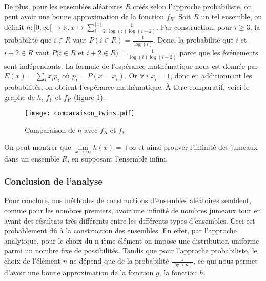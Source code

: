 \documentclass[../main.tex]{subfiles}
\begin{document}
	De plus, pour les ensembles aléatoires $R$ créés selon l'approche probabiliste, on peut avoir une bonne approximation de la fonction $f_{R}$. Soit $R$ un tel ensemble, on définit $ h : [0, \infty[ \rightarrow \mathbb{R}, x \mapsto \sum_{i = 2}^{\lfloor x \rfloor}  \frac{1}{\log(i) \log(i+2)}$. Par construction, pour $i \geqslant 3$, la probabilité que $i \in R$ vaut $P(i \in R) = \frac{1}{\log(i)}$. Donc, la probabilité que $i$ et $i+2 \in R$ vaut $ P(i \in R $ et $i+2 \in R) = \frac{1}{\log(i)\log(i+2)}$ parce que les événements sont indépendants. La formule de l'espérance mathématique nous est donnée par $E(x) = \sum_{i} x_{i}p_{i}$ où $p_{i} = P(x=x_{i})$. Or $\forall~i$ $x_{i} = 1$, donc en additionnant les probabilités, on obtient l'espérance mathématique. À titre comparatif, voici le graphe de $h$, $f_{\mathbb{P}}$ et $f_{R}$ (figure \ref{im:image7}).
\begin{figure}[H]
 \centering
 \texttt{[image: comparaison\_twins.pdf]}
 \caption{Comparaison de $h$ avec $f_{R}$ et $f_{\mathbb{P}}$}
 \label{im:image7}
 \end{figure}
On peut montrer que $\lim\limits_{x \rightarrow \infty} h(x) = + \infty$ et ainsi prouver l'infinité des jumeaux dans un ensemble $R$, en supposant l'ensemble infini. 

\subsubsection{Conclusion de l'analyse}
Pour conclure, nos méthodes de constructions d'ensembles aléatoires semblent, comme pour les nombres premiers, avoir une infinité de nombres jumeaux tout en ayant des résultats très différents entre les différents types d'ensembles. Ceci est probablement dû à la construction des ensembles. En effet, par l'approche analytique, pour le choix du n-ième élément on impose une distribution uniforme parmi un nombre fixe de possibilités. Tandis que pour l'approche probabiliste, le choix de l'élément $n$ ne dépend que de la probabilité $\frac{1}{\log(n)}$, ce qui nous permet d'avoir une bonne approximation de la fonction $g$, la fonction $h$. 

\clearpage
\end{document}
